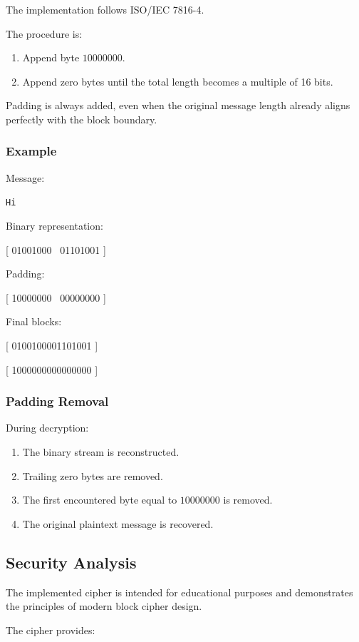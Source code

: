 \documentclass[12pt]{article}
\begin{document}
The implementation follows ISO/IEC 7816-4.

The procedure is:

\begin{enumerate}
\item Append byte $10000000$.
\item Append zero bytes until the total length becomes a multiple of 16 bits.
\end{enumerate}

Padding is always added, even when the original message length already aligns perfectly with the block boundary.

\subsubsection{Example}

Message:

\texttt{Hi}

Binary representation:

[
01001000 \ 01101001
]

Padding:

[
10000000 \ 00000000
]

Final blocks:

[
0100100001101001
]

[
1000000000000000
]

\subsubsection{Padding Removal}

During decryption:

\begin{enumerate}
\item The binary stream is reconstructed.
\item Trailing zero bytes are removed.
\item The first encountered byte equal to $10000000$ is removed.
\item The original plaintext message is recovered.
\end{enumerate}

\subsection{Security Analysis}

The implemented cipher is intended for educational purposes and demonstrates the principles of modern block cipher design.

The cipher provides:
\end{document}
